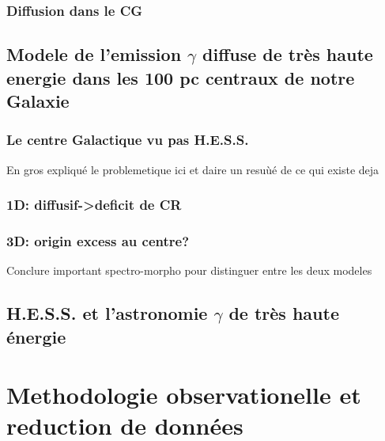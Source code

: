 \documentclass[12pt]{report}
\begin{document}
\section{Diffusion dans le CG}




\chapter{Modele de l'emission $\gamma$ diffuse de très haute energie dans les 100 pc centraux de notre Galaxie}
\section{Le centre Galactique vu pas H.E.S.S.}
En gros expliqué le problemetique ici et daire un resuùé de ce qui existe deja
\section{1D: diffusif->deficit de CR}
\section{3D: origin excess au centre?}
Conclure important spectro-morpho pour distinguer entre les deux modeles

\chapter{H.E.S.S. et l'astronomie $\gamma$ de très haute énergie}


\part{Methodologie observationelle et reduction de données}
\end{document}
